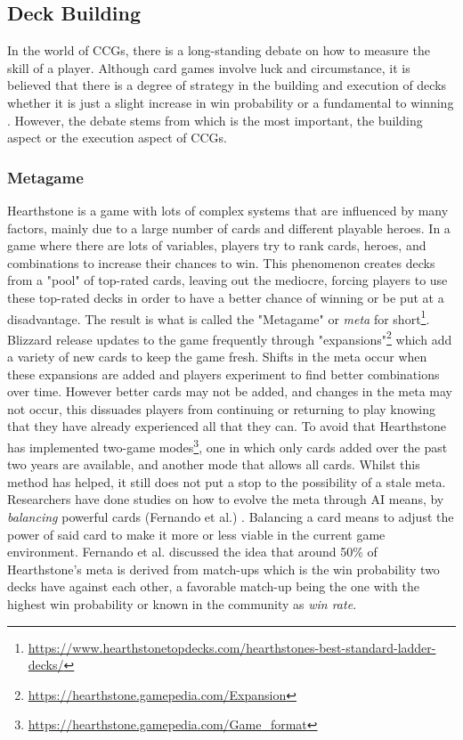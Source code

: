 \documentclass{report} %
\begin{document}
\subsection{Deck Building}
	In the world of CCGs, there is a long-standing debate on how to measure the skill of a player. Although card games involve luck and circumstance, it is believed that there is a degree of strategy in the building and execution of decks whether it is just a slight increase in win probability or a fundamental to winning \cite{SvsL}. However, the debate stems from which is the most important, the building aspect or the execution aspect of CCGs.
	\cite{BvsP}
	\subsubsection{Metagame}
	Hearthstone is a game with lots of complex systems that are influenced by many factors, mainly due to a large number of cards and different playable heroes. In a game where there are lots of variables, players try to rank cards, heroes, and combinations to increase their chances to win. This phenomenon creates decks from a "pool" of top-rated cards, leaving out the mediocre, forcing players to use these top-rated decks in order to have a better chance of winning or be put at a disadvantage. The result is what is called the "Metagame" or {\it{meta}} for short\footnote{\url{https://www.hearthstonetopdecks.com/hearthstones-best-standard-ladder-decks/}}. Blizzard release updates to the game frequently through "expansions"\footnote{\url{https://hearthstone.gamepedia.com/Expansion}} which add a variety of new cards to keep the game fresh. Shifts in the meta occur when these expansions are added and players experiment to find better combinations over time. However better cards may not be added, and changes in the meta may not occur, this dissuades players from continuing or returning to play knowing that they have already experienced all that they can. To avoid that Hearthstone has implemented two-game modes\footnote{\url{https://hearthstone.gamepedia.com/Game_format}}, one in which only cards added over the past two years are available, and another mode that allows all cards. Whilst this method has helped, it still does not put a stop to the possibility of a stale meta. Researchers have done studies on how to evolve the meta through AI means, by {\it{balancing}} powerful cards ({Fernando et al.}) \cite{EvolveMeta}. Balancing a card means to adjust the power of said card to make it more or less viable in the current game environment. Fernando et al. discussed the idea that around 50\% of Hearthstone's meta is derived from match-ups which is the win probability two decks have against each other, a favorable match-up being the one with the highest win probability or known in the community as {\it{win rate}}.  
\end{document}
